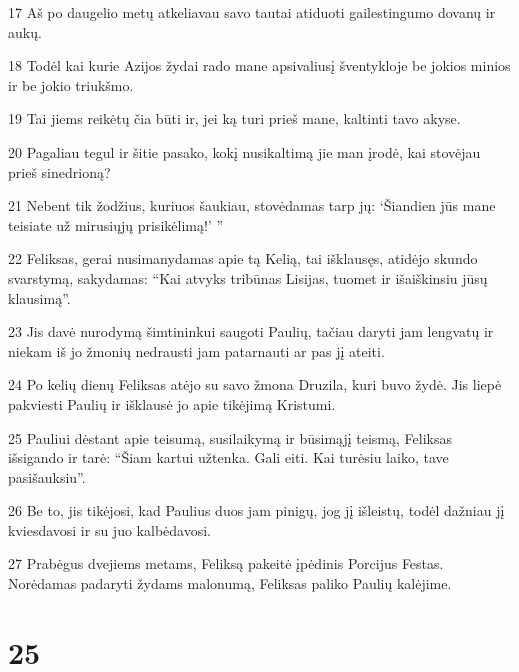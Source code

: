\par 17 Aš po daugelio metų atkeliavau savo tautai atiduoti gailestingumo dovanų ir aukų. 
\par 18 Todėl kai kurie Azijos žydai rado mane apsivaliusį šventykloje be jokios minios ir be jokio triukšmo. 
\par 19 Tai jiems reikėtų čia būti ir, jei ką turi prieš mane, kaltinti tavo akyse. 
\par 20 Pagaliau tegul ir šitie pasako, kokį nusikaltimą jie man įrodė, kai stovėjau prieš sinedrioną? 
\par 21 Nebent tik žodžius, kuriuos šaukiau, stovėdamas tarp jų: ‘Šiandien jūs mane teisiate už mirusiųjų prisikėlimą!’ ” 
\par 22 Feliksas, gerai nusimanydamas apie tą Kelią, tai išklausęs, atidėjo skundo svarstymą, sakydamas: “Kai atvyks tribūnas Lisijas, tuomet ir išaiškinsiu jūsų klausimą”. 
\par 23 Jis davė nurodymą šimtininkui saugoti Paulių, tačiau daryti jam lengvatų ir niekam iš jo žmonių nedrausti jam patarnauti ar pas jį ateiti. 
\par 24 Po kelių dienų Feliksas atėjo su savo žmona Druzila, kuri buvo žydė. Jis liepė pakviesti Paulių ir išklausė jo apie tikėjimą Kristumi. 
\par 25 Pauliui dėstant apie teisumą, susilaikymą ir būsimąjį teismą, Feliksas išsigando ir tarė: “Šiam kartui užtenka. Gali eiti. Kai turėsiu laiko, tave pasišauksiu”. 
\par 26 Be to, jis tikėjosi, kad Paulius duos jam pinigų, jog jį išleistų, todėl dažniau jį kviesdavosi ir su juo kalbėdavosi. 
\par 27 Prabėgus dvejiems metams, Feliksą pakeitė įpėdinis Porcijus Festas. Norėdamas padaryti žydams malonumą, Feliksas paliko Paulių kalėjime.


\chapter{25}


